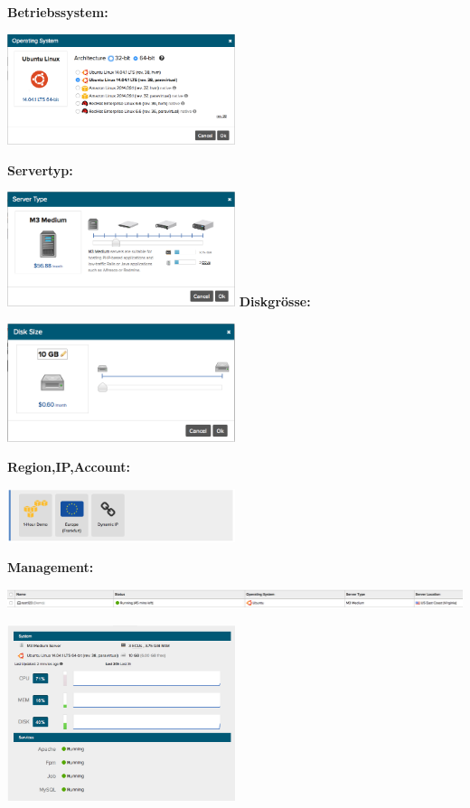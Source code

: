 \textbf{Betriebssystem:}

\includegraphics[width=0.5\textwidth]{./03_Analyse/03_Bitnami/images/aws_operating_system}

\textbf{Servertyp:}

\includegraphics[width=0.5\textwidth]{./03_Analyse/03_Bitnami/images/aws_servertype}
\newpage
\textbf{Diskgrösse:}

\includegraphics[width=0.5\textwidth]{./03_Analyse/03_Bitnami/images/aws_disk}

\textbf{Region,IP,Account:}

\includegraphics[width=0.5\textwidth]{./03_Analyse/03_Bitnami/images/aws_random}

\textbf{Management:}

\includegraphics[width=\textwidth]{./03_Analyse/03_Bitnami/images/aws_overview_managment}

\includegraphics[width=0.5\textwidth]{./03_Analyse/03_Bitnami/images/aws_resourcen}

